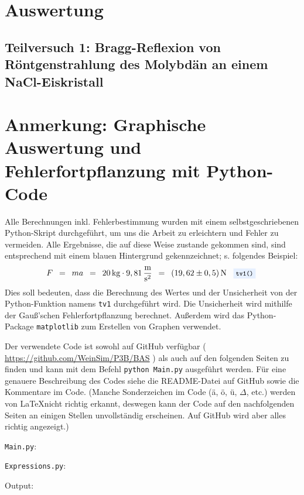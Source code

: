\documentclass{article}
\newcommand{\widespace}{\enspace}
\newcommand{\wideeq}{\widespace = \widespace}
\newcommand{\result}[2]{
    #1 \, \text{#2}
}
\newcommand{\coderef}[1]{
    \text{
        \enspace
        \footnotesize
        \colorbox{codebg}{\texttt{#1()}}
    }
}
\newcommand{\githuburl}{
    \url{https://github.com/WeinSim/P3B/BAS}
}
\begin{document}
\newpage

\section{Auswertung}

    \subsection{Teilversuch 1: Bragg-Reflexion von Röntgenstrahlung des Molybdän an einem NaCl-Eiskristall}

    \newpage

\section{Anmerkung: Graphische Auswertung und Fehlerfortpflanzung mit Python-Code}

Alle Berechnungen inkl. Fehlerbestimmung wurden mit einem selbstgeschriebenen
Python-Skript durchgeführt, um uns die Arbeit zu erleichtern und Fehler zu
vermeiden. Alle Ergebnisse, die auf diese Weise zustande gekommen sind,
sind entsprechend mit einem \colorbox{codebg}{blauen Hintergrund} gekennzeichnet;
s. folgendes Beispiel:
\[
    F \wideeq ma \wideeq \result{20}{kg} \cdot 9,81 \, \frac{\text m}{\text s^2}
    \wideeq \result{(19,62 \pm 0,5)}{N} \coderef{tv1}
\]
Dies soll bedeuten, dass die Berechnung des Wertes und der Unsicherheit von der
Python-Funktion namens \verb|tv1| durchgeführt wird.
Die Unsicherheit wird mithilfe der Gauß'schen Fehlerfortpflanzung berechnet.
Außerdem wird das Python-Package \texttt{matplotlib} zum Erstellen
von Graphen verwendet.

Der verwendete Code ist sowohl auf GitHub verfügbar (\githuburl) als auch auf den
folgenden Seiten zu finden und kann mit dem Befehl \texttt{python Main.py}
ausgeführt werden. Für eine genauere Beschreibung des Codes siehe die README-Datei
auf GitHub sowie die Kommentare im Code.
(Manche Sonderzeichen im Code (ä, ö, ü, $\Delta$, etc.) werden von \LaTeX nicht
richtig erkannt, deswegen kann der Code auf den nachfolgenden Seiten an einigen
Stellen unvollständig erscheinen. Auf GitHub wird aber alles richtig angezeigt.)

\newpage


\verb|Main.py|:

\newpage

\verb|Expressions.py|:

\newpage

Output:

\end{document}
